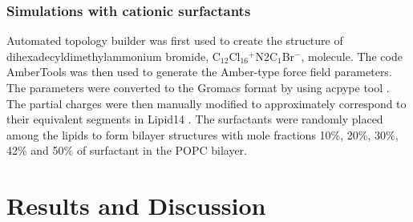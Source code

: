 \documentclass[aip,jcp,twocolumn]{revtex4}
\begin{document}
\subsubsection{Simulations with cationic surfactants}
Automated topology builder \cite{malde11} was first used to create the structure of
dihexadecyldimethylammonium bromide, C$_{12}$Cl$_{16}$$^+$N2C$_1$Br$^-$, molecule.
The code AmberTools \cite{amber} was then used to generate the Amber-type force field
parameters. The parameters were converted to the Gromacs format by using
acpype tool \cite{acpype}. The partial charges were then manually modified
to approximately correspond to their equivalent segments in Lipid14 \cite{dickson14}.
The surfactants were randomly placed among the lipids to form bilayer structures with
mole fractions 10\%, 20\%, 30\%, 42\% and 50\% of surfactant in the POPC bilayer.

\section{Results and Discussion}
\end{document}
